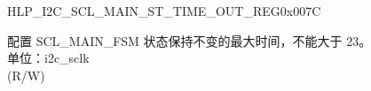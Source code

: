 \begin{register}{H}{LP\_I2C\_SCL\_MAIN\_ST\_TIME\_OUT\_REG}{0x007C}\label{regdesc:LPI2CSCLMAINSTTIMEOUTREG}
%
%
\regnewline%
\begin{regdesc}\begin{reglist}
\label{fielddesc:LPI2CSCLMAINSTTOI2C}\item [LP\_I2C\_SCL\_MAIN\_ST\_TO\_I2C] 配置 SCL\_MAIN\_FSM 状态保持不变的最大时间，不能大于 23。\\
单位：i2c\_sclk \\ (R/W)
\end{reglist}\end{regdesc}
\end{register}


